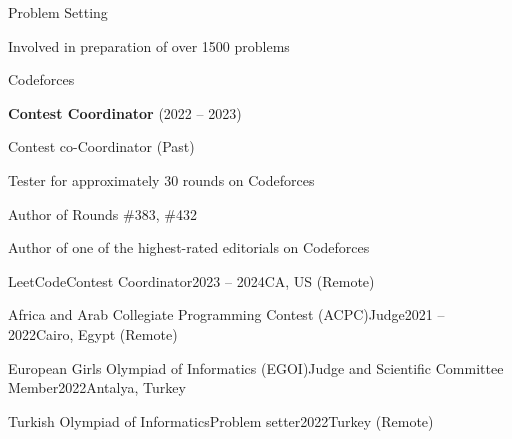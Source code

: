 
\begin{section}{Problem Setting}

  \item Involved in preparation of over 1500 problems
  
  \begin{subsection}{Codeforces}{}{}{}
    \item \textbf{Contest Coordinator} (2022 – 2023)
    \item Contest co-Coordinator (Past)
    \item Tester for approximately 30 rounds on Codeforces
    \item Author of Rounds \#383, \#432
    \item Author of one of the highest-rated editorials on Codeforces
  \end{subsection}

  \begin{subsection}{LeetCode}{Contest Coordinator}{2023 – 2024}{CA, US (Remote)}
  \end{subsection}

  \begin{subsection}{Africa and Arab Collegiate Programming Contest (ACPC)}{Judge}{2021 – 2022}{Cairo, Egypt (Remote)}
  \end{subsection}

  \begin{subsection}{European Girls Olympiad of Informatics (EGOI)}{Judge and Scientific Committee Member}{2022}{Antalya, Turkey}
  \end{subsection}

  \begin{subsection}{Turkish Olympiad of Informatics}{Problem setter}{2022}{Turkey (Remote)}
  \end{subsection}


\end{section}
